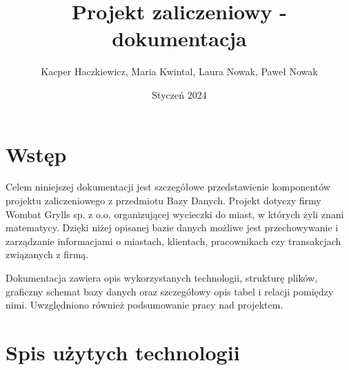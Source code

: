 \documentclass{article}
\author{Kacper Haczkiewicz, Maria Kwintal, Laura Nowak, Paweł Nowak}
\title{\textbf{Projekt zaliczeniowy - dokumentacja}}
\date{Styczeń 2024}
\begin{document}
	
	\maketitle
	
	\section{Wstęp}
	
	Celem niniejszej dokumentacji jest szczegółowe przedstawienie komponentów projektu zaliczeniowego z przedmiotu Bazy Danych. Projekt dotyczy firmy Wombat Grylls sp. z o.o. organizującej wycieczki do miast, w których żyli znani matematycy. Dzięki niżej opisanej bazie danych możliwe jest przechowywanie i zarządzanie informacjami o miastach, klientach, pracownikach czy transakcjach związanych z firmą.
	
	Dokumentacja zawiera opis wykorzystanych technologii, strukturę plików, graficzny schemat bazy danych oraz szczegółowy opis tabel i relacji pomiędzy nimi. Uwzględniono również podsumowanie pracy nad projektem.
	
	\section{Spis użytych technologii}
	
\end{document}
